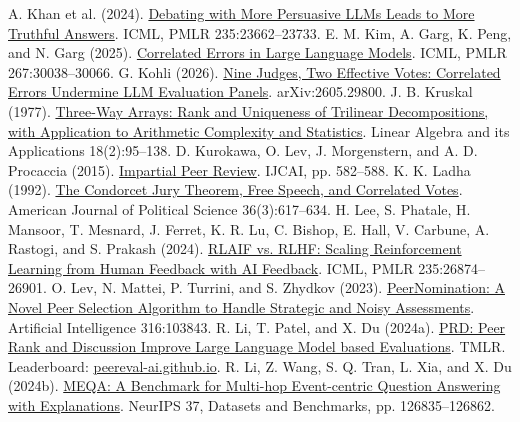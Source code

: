 \begin{thebibliography}{}
 A. Khan et al. (2024). \href{https://proceedings.mlr.press/v235/khan24a.html}{Debating with More Persuasive LLMs Leads to More Truthful Answers}. ICML, PMLR 235:23662--23733.
 E. M. Kim, A. Garg, K. Peng, and N. Garg (2025). \href{https://proceedings.mlr.press/v267/kim25e.html}{Correlated Errors in Large Language Models}. ICML, PMLR 267:30038--30066.
 G. Kohli (2026). \href{https://arxiv.org/abs/2605.29800}{Nine Judges, Two Effective Votes: Correlated Errors Undermine LLM Evaluation Panels}. arXiv:2605.29800.
 J. B. Kruskal (1977). \href{https://doi.org/10.1016/0024-3795(77)90069-6}{Three-Way Arrays: Rank and Uniqueness of Trilinear Decompositions, with Application to Arithmetic Complexity and Statistics}. Linear Algebra and its Applications 18(2):95--138.
 D. Kurokawa, O. Lev, J. Morgenstern, and A. D. Procaccia (2015). \href{https://www.ijcai.org/Abstract/15/088}{Impartial Peer Review}. IJCAI, pp. 582--588.
 K. K. Ladha (1992). \href{https://doi.org/10.2307/2111584}{The Condorcet Jury Theorem, Free Speech, and Correlated Votes}. American Journal of Political Science 36(3):617--634.
 H. Lee, S. Phatale, H. Mansoor, T. Mesnard, J. Ferret, K. R. Lu, C. Bishop, E. Hall, V. Carbune, A. Rastogi, and S. Prakash (2024). \href{https://proceedings.mlr.press/v235/lee24t.html}{RLAIF vs. RLHF: Scaling Reinforcement Learning from Human Feedback with AI Feedback}. ICML, PMLR 235:26874--26901.
 O. Lev, N. Mattei, P. Turrini, and S. Zhydkov (2023). \href{https://doi.org/10.1016/j.artint.2022.103843}{PeerNomination: A Novel Peer Selection Algorithm to Handle Strategic and Noisy Assessments}. Artificial Intelligence 316:103843.
 R. Li, T. Patel, and X. Du (2024a). \href{https://openreview.net/forum?id=YVD1QqWRaj}{PRD: Peer Rank and Discussion Improve Large Language Model based Evaluations}. TMLR. Leaderboard: \href{https://peereval-ai.github.io}{peereval-ai.github.io}.
 R. Li, Z. Wang, S. Q. Tran, L. Xia, and X. Du (2024b). \href{https://proceedings.neurips.cc/paper_files/paper/2024/hash/e560a0b22e4432003d0dba63ff8dc457-Abstract.html}{MEQA: A Benchmark for Multi-hop Event-centric Question Answering with Explanations}. NeurIPS 37, Datasets and Benchmarks, pp. 126835--126862.

\end{thebibliography}
